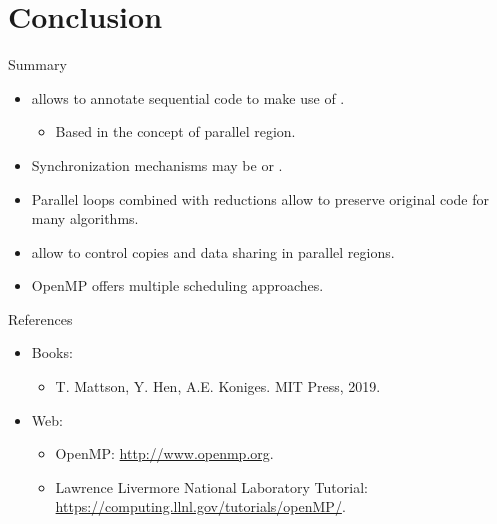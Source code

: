 \section{Conclusion}

\begin{frame}[t]{Summary}
\begin{itemize}
  \item {} allows to annotate sequential code
        to make use of 
        .
    \begin{itemize}
      \item Based in the concept of parallel region.
    \end{itemize}

  \item Synchronization mechanisms may be
         or 
        .

  \item Parallel loops combined with reductions allow to preserve
        original code for many algorithms.

  \item {} allow to control
        copies and data sharing in parallel regions.

  \item OpenMP offers multiple scheduling approaches.
\end{itemize}
\end{frame}


\begin{frame}[t]{References}
\begin{itemize}
  \item Books:
    \begin{itemize}
      \item {}
            T. Mattson, Y. Hen, A.E. Koniges.
            MIT Press, 2019.
    \end{itemize}

  \item Web:
    \begin{itemize}
      \item OpenMP: \url{http://www.openmp.org}.
      \item Lawrence Livermore National Laboratory Tutorial: \url{https://computing.llnl.gov/tutorials/openMP/}.
    \end{itemize}
\end{itemize}
\end{frame}
